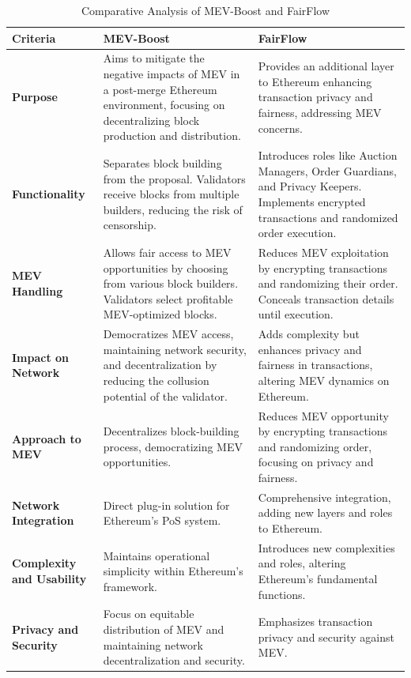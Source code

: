 \documentclass{article}
\begin{document}
\begin{table}[h]
\centering
\begin{tabular}{ | >{\raggedright}p{3cm} | >{\raggedright}p{6cm} | >{\raggedright\arraybackslash}p{6cm} | }
\hline
\textbf{Criteria} & \textbf{MEV-Boost} & \textbf{FairFlow} \\
\hline

\textbf{Purpose} & Aims to mitigate the negative impacts of MEV in a post-merge Ethereum environment, focusing on decentralizing block production and distribution. & Provides an additional layer to Ethereum enhancing transaction privacy and fairness, addressing MEV concerns. \\
\hline

\textbf{Functionality} & 
Separates block building from the proposal. Validators receive blocks from multiple builders, reducing the risk of censorship. & 
Introduces roles like Auction Managers, Order Guardians, and Privacy Keepers. Implements encrypted transactions and randomized order execution. \\
\hline

\textbf{MEV Handling} & 
Allows fair access to MEV opportunities by choosing from various block builders. Validators select profitable MEV-optimized blocks. & 
Reduces MEV exploitation by encrypting transactions and randomizing their order. Conceals transaction details until execution. \\
\hline

\textbf{Impact on Network} & 
Democratizes MEV access, maintaining network security, and decentralization by reducing the collusion potential of the validator. & 
Adds complexity but enhances privacy and fairness in transactions, altering MEV dynamics on Ethereum. \\
\hline

\textbf{Approach to MEV} & 
Decentralizes block-building process, democratizing MEV opportunities. & 
Reduces MEV opportunity by encrypting transactions and randomizing order, focusing on privacy and fairness. \\
\hline

\textbf{Network Integration} & 
Direct plug-in solution for Ethereum's PoS system. & 
Comprehensive integration, adding new layers and roles to Ethereum. \\
\hline

\textbf{Complexity and Usability} & 
Maintains operational simplicity within Ethereum's framework. & 
Introduces new complexities and roles, altering Ethereum's fundamental functions. \\
\hline

\textbf{Privacy and Security} & Focus on equitable distribution of MEV and maintaining network decentralization and security. & 
Emphasizes transaction privacy and security against MEV. \\
\hline
\end{tabular}
\caption{Comparative Analysis of MEV-Boost and FairFlow}
\label{table:mev-fairflow}
\end{table}
\end{document}
